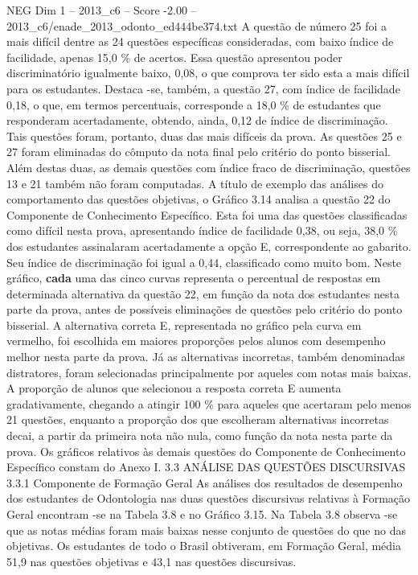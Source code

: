\begin{textsample}{NEG Dim 1 – 2013\_c6 – Score -2.00 – 2013\_c6/enade\_2013\_odonto\_ed444be374.txt}
A questão de número 25 foi a mais difícil dentre as 24 questões específicas consideradas, com baixo índice de facilidade, apenas 15,0 \% de acertos.
Essa questão apresentou poder discriminatório igualmente baixo, 0,08, o que comprova ter sido esta a mais difícil para os estudantes.
Destaca -se, também, a questão 27, com índice de facilidade 0,18, o que, em termos percentuais, corresponde a 18,0 \% de estudantes que responderam acertadamente, obtendo, ainda, 0,12 de índice de discriminação.
Tais questões foram, portanto, duas das mais difíceis da prova.
As questões 25 e 27 foram eliminadas do cômputo da nota final pelo critério do ponto bisserial.
Além destas duas, as demais questões com índice fraco de discriminação, questões 13 e 21 também não foram computadas.
A título de exemplo das análises do comportamento das questões objetivas, o Gráfico 3.14 analisa a questão 22 do Componente de Conhecimento Específico.
Esta foi uma das questões classificadas como difícil nesta prova, apresentando índice de facilidade 0,38, ou seja, 38,0 \% dos estudantes assinalaram acertadamente a opção E, correspondente ao gabarito.
Seu índice de discriminação foi igual a 0,44, classificado como muito bom.
Neste gráfico, \textbf{cada} uma das cinco curvas representa o percentual de respostas em determinada alternativa da questão 22, em função da nota dos estudantes nesta parte da prova, antes de possíveis eliminações de questões pelo critério do ponto bisserial.
A alternativa correta E, representada no gráfico pela curva em vermelho, foi escolhida em maiores proporções pelos alunos com desempenho melhor nesta parte da prova.
Já as alternativas incorretas, também denominadas distratores, foram selecionadas principalmente por aqueles com notas mais baixas.
A proporção de alunos que selecionou a resposta correta E aumenta gradativamente, chegando a atingir 100 \% para aqueles que acertaram pelo menos 21 questões, enquanto a proporção dos que escolheram alternativas incorretas decai, a partir da primeira nota não nula, como função da nota nesta parte da prova.
Os gráficos relativos às demais questões do Componente de Conhecimento Específico constam do Anexo I. 3.3 ANÁLISE DAS QUESTÕES DISCURSIVAS 3.3.1 Componente de Formação Geral As análises dos resultados de desempenho dos estudantes de Odontologia nas duas questões discursivas relativas à Formação Geral encontram -se na Tabela 3.8 e no Gráfico 3.15.
Na Tabela 3.8 observa -se que as notas médias foram mais baixas nesse conjunto de questões do que no das objetivas.
Os estudantes de todo o Brasil obtiveram, em Formação Geral, média 51,9 nas questões objetivas e 43,1 nas questões discursivas.

\end{textsample}
